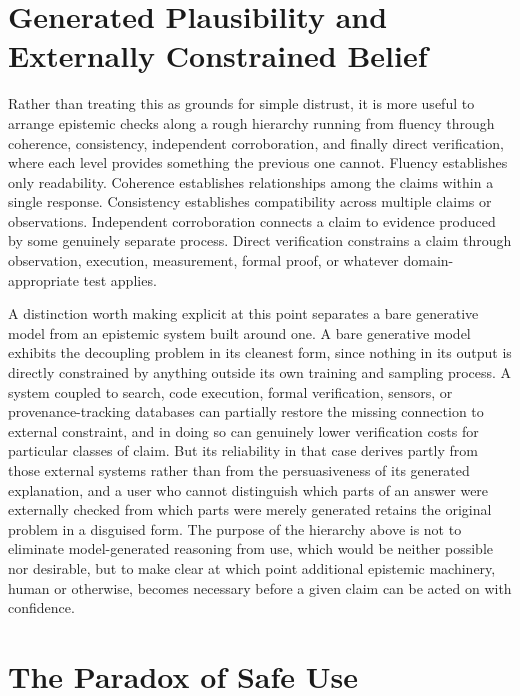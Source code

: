 \documentclass[11pt]{article}
\begin{document}
\section{Generated Plausibility and Externally Constrained Belief}

Rather than treating this as grounds for simple distrust, it is more useful to arrange epistemic checks along a rough hierarchy running from fluency through coherence, consistency, independent corroboration, and finally direct verification, where each level provides something the previous one cannot. Fluency establishes only readability. Coherence establishes relationships among the claims within a single response. Consistency establishes compatibility across multiple claims or observations. Independent corroboration connects a claim to evidence produced by some genuinely separate process. Direct verification constrains a claim through observation, execution, measurement, formal proof, or whatever domain-appropriate test applies.

A distinction worth making explicit at this point separates a bare generative model from an epistemic system built around one. A bare generative model exhibits the decoupling problem in its cleanest form, since nothing in its output is directly constrained by anything outside its own training and sampling process. A system coupled to search, code execution, formal verification, sensors, or provenance-tracking databases can partially restore the missing connection to external constraint, and in doing so can genuinely lower verification costs for particular classes of claim. But its reliability in that case derives partly from those external systems rather than from the persuasiveness of its generated explanation, and a user who cannot distinguish which parts of an answer were externally checked from which parts were merely generated retains the original problem in a disguised form. The purpose of the hierarchy above is not to eliminate model-generated reasoning from use, which would be neither possible nor desirable, but to make clear at which point additional epistemic machinery, human or otherwise, becomes necessary before a given claim can be acted on with confidence.

\section{The Paradox of Safe Use}
\end{document}
